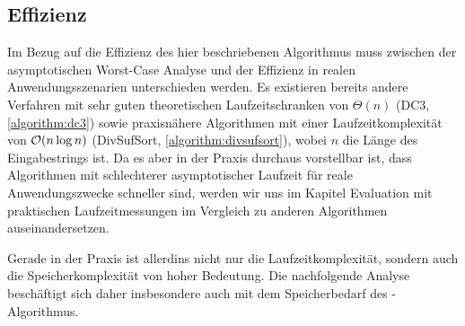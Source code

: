 \subsection{Effizienz}
\label{bpr:effizienz}

Im Bezug auf die Effizienz des hier beschriebenen Algorithmus muss zwischen der asymptotischen Worst-Case Analyse und der Effizienz in realen Anwendungsszenarien unterschieden werden. Es existieren bereits andere Verfahren mit sehr guten theoretischen Laufzeitschranken von \(\Theta(n)\) \cite{saca:9} (DC3, \cref{algorithm:dc3}) sowie praxisnähere Algorithmen mit einer Laufzeitkomplexität von \(\mathcal{O}(n \log n)\) \cite{saca:5} (DivSufSort, \cref{algorithm:divsufsort}), wobei \(n\) die Länge des Eingabestrings ist. Da es aber in der Praxis durchaus vorstellbar ist, dass Algorithmen mit schlechterer asymptotischer Laufzeit für reale Anwendungszwecke schneller sind, werden wir uns im Kapitel Evaluation mit praktischen Laufzeitmessungen im Vergleich zu anderen Algorithmen auseinandersetzen.\par
Gerade in der Praxis ist allerdins nicht nur die Laufzeitkomplexität, sondern auch die Speicherkomplexität von hoher Bedeutung. Die nachfolgende Analyse beschäftigt sich daher insbesondere auch mit dem Speicherbedarf des \bpr-Algorithmus.


%

